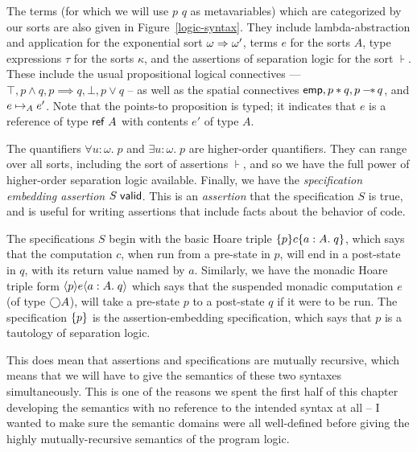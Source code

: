 The terms (for which we will use $p$ $q$ as metavariables) which are
categorized by our sorts are also given in Figure~\ref{logic-syntax}.
They include lambda-abstraction and application for the exponential
sort $\omega \Rightarrow \omega'$, terms $e$ for the sorts $A$, type
expressions $\tau$ for the sorts $\kappa$, and the assertions of
separation logic for the sort $\assert$. These include the usual
propositional logical connectives --- $\top, p \land q, p \implies q,
\bot, p \vee q$ -- as well as the spatial connectives $\mathsf{emp}, p * q, p
-\!\!*\, q$, and $e \mapsto_A e'$. Note that the points-to proposition
is typed; it indicates that $e$ is a reference of type $\mathsf{ref}\;A$
with contents $e'$ of type $A$. 

The quantifiers $\forall u:\omega.\; p$ and $\exists u:\omega.\; p$
are higher-order quantifiers. They can range over all sorts, including
the sort of assertions $\assert$, and so we have the full power of
higher-order separation logic available.  Finally, we have the
\emph{specification embedding assertion} ${S}\;\mathsf{valid}$.  This is an
\emph{assertion} that the specification $S$ is true, and is useful for
writing assertions that include facts about the behavior of code.

The specifications $S$ begin with the basic Hoare triple
$\{{p}\}{c}\{{a:A}.\;{q}\}$, which says that the computation $c$, when run
from a pre-state in $p$, will end in a post-state in $q$, with its
return value named by $a$. Similarly, we have the monadic Hoare triple
form $\langle{p}\rangle{e}\langle{a:A}.\;{q}\rangle$ which says that the suspended monadic
computation $e$ (of type $\bigcirc{A}$), will take a pre-state $p$ to a
post-state $q$ if it were to be run. The specification $\{{p}\}$ is
the assertion-embedding specification, which says that $p$ is a
tautology of separation logic. 

This does mean that assertions and specifications are mutually
recursive, which means that we will have to give the semantics of 
these two syntaxes simultaneously. This is one of the reasons we
spent the first half of this chapter developing the semantics with
no reference to the intended syntax at all -- I wanted to make sure
the semantic domains were all well-defined before giving the highly
mutually-recursive semantics of the program logic. 

